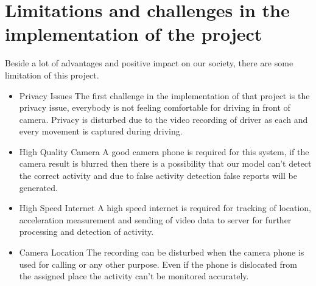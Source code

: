 \chapter{Limitations and challenges in the implementation of the project}
Beside a lot of advantages and positive impact on our society, there are some limitation of this project.
\begin{itemize}
    \item Privacy Issues \newline
    The first challenge in the implementation of that project is the privacy issue, everybody is not
feeling comfortable for driving in front of camera. Privacy is disturbed due to the video recording of
driver as each and every movement is captured during driving.
\item High Quality Camera \newline
A good camera phone is required for this system, if the camera result is blurred then there is a
possibility that our model can’t detect the correct activity and due to false activity detection false
reports will be generated.
\item High Speed Internet \newline
A high speed internet is required for tracking of location, acceleration measurement and
sending of video data to server for further processing and detection of activity.
\item Camera Location \newline
The recording can be disturbed when the camera phone is used for calling or any other purpose.
Even if the phone is dislocated from the assigned place the activity can’t be monitored accurately.
\end{itemize}

